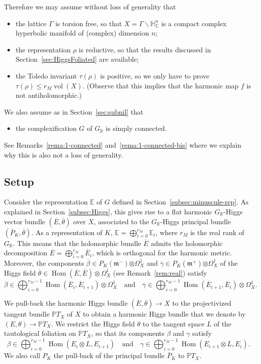 \documentclass[10pt]{amsart}
\theoremstyle{plain}
\theoremstyle{definition}
\let\ov\overline
\DeclareMathOperator{\Hom}{Hom}
\DeclareMathOperator{\vol}{vol}
\newcommand{\bE}{\mathbb{E}}
\newcommand{\bR}{\mathbb{R}}
\newcommand{\HC}{{\mathbb{H}^n_\mathbb{C}}}
\newcommand{\PTX}{{\mathbb{P}T_X}}
\newcommand{\fm}{\mathfrak{m}}
\newcommand{\rkm}{{r_M}}
\newcommand{\ovE}{\ov{E}}
\newcommand{\ovb}{\ov{\beta}}
\newcommand{\ovg}{\ov{\gamma}}
\newcommand{\ovt}{\ov{\theta}}
\begin{document}
Therefore we may assume without loss of generality that
\begin{itemize}
\item the lattice $\Gamma$ is torsion free, so that $X=\Gamma\backslash\HC$ is a compact
complex hyperbolic manifold of (complex) dimension $n$;
\item the representation $\rho$ is reductive, so that the results discussed in
Section~\ref{sec:HiggsFoliated} are available;
\item the Toledo invariant $\tau(\rho)$ is positive, so we only have to prove
\hbox{$\tau(\rho)\!\leq\!\rkm\vol(X)$}. (Observe that this implies that the harmonic map $f$ is not
antiholomorphic.)
\end{itemize}
We also assume as in Section~\ref{sec:subnil} that
\begin{itemize}
\item the complexification $G$ of $G_\bR$ is simply connected.
\end{itemize}
See Remarks~\ref{rema:1-connected} and~\ref{rema:1-connected-bis} where we explain why this is also
not a loss of generality.

\subsection{Setup}\label{subsec:setup}

Consider the representation $\bE$ of $G$ defined in Section~\ref{subsec:minuscule-rep}. As \hbox{explained}
in Section~\ref{subsec:Higgs}, this gives rise to a flat
harmonic $G_\bR$-Higgs vector bundle $(\ovE,\ovt)$ over $X$, associated to the $G_\bR$-Higgs principal
bundle $(\bar{P}_K,\ovt)$.
As a representation of $K$, $\bE=\bigoplus_{i=0}^\rkm\bE_{i}$, where $\rkm$ is the real rank of $G_\bR$. This
means that the holomorphic bundle $\ovE$ admits the holomorphic decomposition
$\ovE=\bigoplus_{i=0}^\rkm \ovE_{i}$, which is orthogonal for the harmonic metric. Moreover,
the components $\ovb\in P_K(\fm^-){\otimes\Omega^1_X}$ and $\ovg\in P_K(\fm^+){\otimes\Omega^1_X}$ of
the Higgs field $\ovt\in \Hom(\ovE,\ovE)\otimes\Omega^1_X$ (see Remark~\ref{rem:real}) satisfy
$$
\ovb\in\bigoplus_{i=0}^{\rkm-1}\Hom(\ovE_{i},\ovE_{i+1})\otimes \Omega^1_X\quad\mbox{and}\quad
\ovg\in\bigoplus_{i=0}^{\rkm-1}\Hom(\ovE_{i+1},\ovE_{i})\otimes \Omega^1_X.
$$

We pull-back the harmonic Higgs bundle $(\ovE,\ovt)\to X$ to the projectivized tangent bundle
$\PTX$ of $X$ to obtain a harmonic Higgs bundle that
we denote by $(E,\theta)\to\PTX$. We restrict the Higgs field $\theta$ to the tangent space $L$ of the tautological
foliation on
$\PTX$, so that its components $\beta$ and $\gamma$ satisfy
$$
\beta\in\bigoplus_{i=0}^{\rkm-1}\Hom(E_{i}\otimes L, E_{i+1})\quad\mbox{and}\quad
\gamma\in\bigoplus_{i=0}^{\rkm-1}\Hom(E_{i+1}\otimes L, E_{i}).
$$
We also call $P_K$ the pull-back of the principal bundle $\bar P_K$ to $\PTX$.
\end{document}
